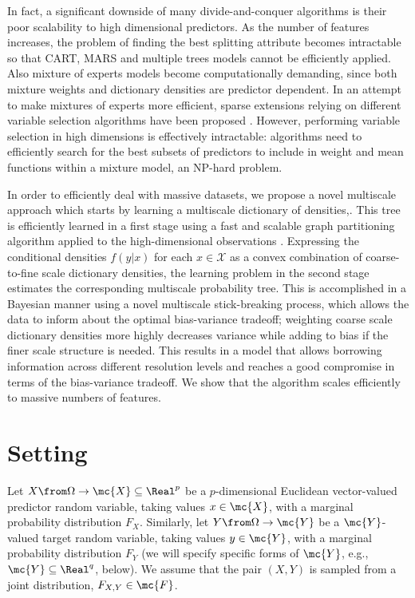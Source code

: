 In fact, a significant downside of many divide-and-conquer algorithms is their poor scalability to high dimensional predictors. As the number of features increases, the problem of finding the best splitting attribute becomes intractable so that CART, MARS and multiple trees models cannot be efficiently applied. Also mixture of experts models become computationally demanding, since both mixture weights and dictionary densities are predictor dependent. In an attempt to make mixtures of experts more efficient, sparse extensions relying on different variable selection algorithms have been proposed \cite{SparseMoF}. However, performing variable selection in high dimensions is effectively intractable: algorithms need to efficiently search for the best subsets of predictors to include in weight and mean functions within a mixture model, an NP-hard problem.

 In order to efficiently deal with massive datasets, we propose a novel multiscale approach which starts by learning a multiscale dictionary of densities,. This tree is efficiently learned in a first stage using a fast and scalable graph partitioning algorithm applied to the high-dimensional observations \cite{metis}.  Expressing the conditional densities $f(y|x)$ for each $x \in \mathcal{X}$ as a convex combination of coarse-to-fine scale dictionary densities, the learning problem in the second stage estimates the corresponding multiscale probability tree.  This is accomplished in a Bayesian manner using a novel multiscale stick-breaking process, which allows the data to inform about the optimal bias-variance tradeoff; weighting coarse scale dictionary densities more highly decreases variance while adding to bias if the finer scale structure is needed.  This results in a model that allows borrowing information across different resolution levels and reaches a good compromise in terms of the bias-variance tradeoff. We show that the algorithm scales efficiently to massive numbers of features. 


\section{Setting} \label{section:setting}
Let $X \from \Omega \to \mc{X} \subseteq \Real^p$ be a 
$p$-dimensional Euclidean vector-valued predictor random variable, taking values $x \in \mc{X}$, with a marginal probability distribution $F_X$.  
Similarly, let $Y \from \Omega \to \mc{Y}$ 
be a $\mc{Y}$-valued target random variable, taking values $y \in \mc{Y}$, with a marginal probability distribution $F_Y$ (we will specify specific forms of $\mc{Y}$, e.g., $\mc{Y} \subseteq \Real^q$, below).  We assume that the pair $(X,Y)$ is sampled from a joint distribution, $F_{X,Y} \in \mc{F}$.

